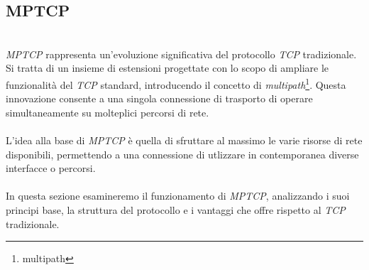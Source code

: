 \subsection{MPTCP}
~\\
\indent \emph{MPTCP } rappresenta un'evoluzione significativa del protocollo \emph{TCP} tradizionale. 
Si tratta di un insieme di estensioni progettate con lo scopo di ampliare le funzionalità del \emph{TCP} standard,
introducendo il concetto di \emph{multipath}\footnote{\gls{multipath}}. Questa innovazione consente a una singola connessione di trasporto di operare simultaneamente su molteplici percorsi di rete.
\\\\
L'idea alla base di \emph{MPTCP} è quella di sfruttare al massimo le varie risorse di rete disponibili, permettendo a una connessione di utlizzare in contemporanea diverse interfacce o percorsi.
\\\\
In questa sezione esamineremo il funzionamento di \emph{MPTCP}, analizzando i suoi principi base, la struttura del protocollo e i vantaggi che offre rispetto al \emph{TCP} tradizionale. 


